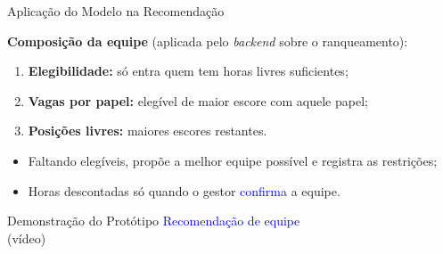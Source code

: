 \documentclass{beamer}
\begin{document}
\begin{frame}[allowframebreaks]{Aplicação do Modelo na Recomendação}
    \framebreak

    \raggedright \textbf{Composição da equipe} (aplicada pelo \textit{backend} sobre o ranqueamento):
    \begin{enumerate}
        \item \textbf{Elegibilidade:} só entra quem tem horas livres suficientes;
        \item \textbf{Vagas por papel:} elegível de maior escore com aquele papel;
        \item \textbf{Posições livres:} maiores escores restantes.
    \end{enumerate}
    \begin{itemize}
        \item Faltando elegíveis, propõe a melhor equipe possível e registra as restrições;
        \item Horas descontadas só quando o gestor \textcolor{blue}{confirma} a equipe.
    \end{itemize}
\end{frame}

\begin{frame}{Demonstração do Protótipo}
    \centering
    \vfill
    {\Large \textcolor{blue}{Recomendação de equipe}}\\[1em]
    (vídeo)
    \vfill
\end{frame}
\end{document}
